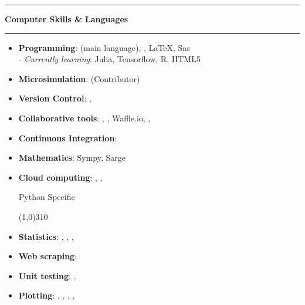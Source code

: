 \documentclass[a4paper,11pt]{article} %
\newcommand{\myhref}[3][blue]{\href{#2}{\color{#1}{#3}}}%
\newcommand{\titre}[1]{%
	\begin{center}
	\rule{\textwidth}{1pt}
	\par\vspace{0.1cm}
        \textbf{\large #1}
	\par\rule{\textwidth}{1pt}
	\end{center}
	}
\begin{document}
\titre{Computer Skills \& Languages}

\begin{itemize}
\item \textbf{Programming}:  \myhref[black-gray]{https://www.python.org}{Python}(main language), \myhref[black-gray]{https://www.gnu.org/software/bash/}{Bash}, \LaTeX, Sas \\
  \hspace*{0.1cm}- \emph{Currently learning}: Julia, Tensorflow, R, HTML5
\item \textbf{Microsimulation}:   \myhref[black-gray]{https://fr.openfisca.org}{OpenFisca} (Contributor)
\item \textbf{Version Control}:  \myhref[black-gray]{https://git-scm.com}{git}, \myhref[black-gray]{https://gitless.com}{gitless}


\item \textbf{Collaborative tools}:  \myhref[black-gray]{https://www.github.com/}{GitHub}, \myhref[black-gray]{https://www.github.com/}{Slack}, Waffle.io, \myhref[black-gray]{https://colab.research.google.com/}{Google Colab}, \myhref[black-gray]{https://visualstudio.microsoft.com/services/live-share/}{VS Live Share}

 \item \textbf{Continuous Integration}:  \myhref[black-gray]{https://travis-ci.com/}{Travis CI}
\item \textbf{Mathematics}: Sympy, Sarge
\item \textbf{Cloud computing}: \myhref[black-gray]{https://aws.amazon.com/fr/}{AWS}, \myhref[black-gray]{https://www.kaggle.com/docs/kernels}{Kaggle Kernels}, \myhref[black-gray]{https://www.scaleway.com}{Scaleway}



 Python Specific
 \vspace{-0.5cm}
 \begin{flushleft}
\line(1,0){310}
\end{flushleft}
 \item \textbf{Statistics}: \myhref[black-gray]{http://pandas.pydata.org}{Pandas}, \myhref[black-gray]{http://www.statsmodels.org/stable/}{Statsmodels}, \myhref[black-gray]{https://bashtage.github.io/linearmodels/}{linearmodels}, \myhref[black-gray]{https://scikit-learn.org/stable/}{Scikit-Learn} 

\item \textbf{Web scraping}:  \myhref[black-gray]{https://www.crummy.com/software/BeautifulSoup/}{Beautiful Soup}
\item  \textbf{Unit testing}: \myhref[black-gray]{https://docs.pytest.org/}{Pytest},  \myhref[black-gray]{https://nose.readthedocs.io/en/latest/}{Nose}
\item  \textbf{Plotting}: \myhref[black-gray]{https://matplotlib.org}{Matplotlib},  \myhref[black-gray]{https://seaborn.pydata.org}{Seaborn}, \myhref[black-gray]{https://bokeh.pydata.org/en/latest/}{Bokeh},  \myhref[black-gray]{https://plot.ly/python/}{Plotly},  
\myhref[black-gray]{https://altair-viz.github.io}{Altair}
 \vspace{0.3cm}
 

\end{itemize}
\end{document}
